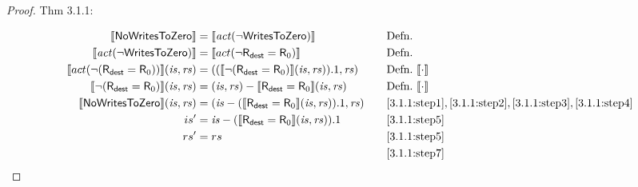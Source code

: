 \documentclass[12pt, letterpaper]{article}
\newcommand\interp[1]{\llbracket #1 \rrbracket}
\begin{document}
\begin{proof}
 Thm 3.1.1:
 \par\nobreak
 {\fontsize{10pt}{12pt}\selectfont
   \begin{alignat}{2}
     \setcounter{equation}{0}
     \label{3.1.1:step1}
     \interp{\mathsf{NoWritesToZero}}
     &= \interp{\mathit{act}(\neg \mathsf{WritesToZero})}
     &&\quad \text{Defn.}\\
     \label{3.1.1:step2}
     \interp{\mathit{act}(\neg \mathsf{WritesToZero})}
     &= \interp{act(\neg \mathsf{R}_{\mathsf{dest}} = \mathsf{R}_0)}
     &&\quad \text{Defn.}\\
     \label{3.1.1:step3}
     \interp{act(\neg(\mathsf{R}_{\mathsf{dest}} = \mathsf{R}_0))}(\mathit{is},\mathit{rs})
     &= ((\interp{\neg(\mathsf{R}_{\mathsf{dest}} = \mathsf{R}_0)}(\mathit{is},\mathit{rs})).1, \mathit{rs})
     &&\quad \text{Defn.}\ \interp{\cdot}\\    
     \label{3.1.1:step4}
     \interp{\neg(\mathsf{R}_{\mathsf{dest}} = \mathsf{R}_0)}(\mathit{is},\mathit{rs})
     &= (\mathit{is},\mathit{rs}) - \interp{\mathsf{R}_{\mathsf{dest}} = \mathsf{R}_0}(\mathit{is},\mathit{rs})
     &&\quad \text{Defn.}\ \interp{\cdot}\\    
     \label{3.1.1:step5}
     \interp{\mathsf{NoWritesToZero}}(\mathit{is},\mathit{rs})
     &= (\mathit{is} - (\interp{\mathsf{R}_{\mathsf{dest}} = \mathsf{R}_0}(\mathit{is},\mathit{rs})).1, \mathit{rs})
     &&\quad \ref{3.1.1:step1},\ref{3.1.1:step2},\ref{3.1.1:step3},\ref{3.1.1:step4}\\
     \label{3.1.1:step6}
     is' &= \mathit{is} - (\interp{\mathsf{R}_{\mathsf{dest}} = \mathsf{R}_0}(\mathit{is},\mathit{rs})).1
     &&\quad \ref{3.1.1:step5} \\
     \label{3.1.1:step7}
     rs' &= rs 
     &&\quad \ref{3.1.1:step5} \\
     \label{3.1.1:qed}
     &\qedhere
    &&\quad \ref{3.1.1:step7}
   \end{alignat}
 }%
 \end{proof}
 
\end{document}
